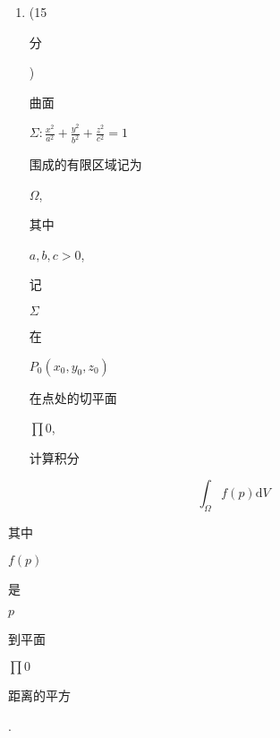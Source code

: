 \documentclass[10pt]{article}
\begin{document}
\begin{enumerate}
  \item (15 \begin{CJK}{UTF8}{mj}分\end{CJK}) \begin{CJK}{UTF8}{mj}曲面\end{CJK} $\Sigma: \frac{x^{2}}{a^{2}}+\frac{y^{2}}{b^{2}}+\frac{z^{2}}{c^{2}}=1$ \begin{CJK}{UTF8}{mj}围成的有限区域记为\end{CJK} $\Omega$, \begin{CJK}{UTF8}{mj}其中\end{CJK} $a, b, c>0$, \begin{CJK}{UTF8}{mj}记\end{CJK} $\Sigma$ \begin{CJK}{UTF8}{mj}在\end{CJK} $P_{0}\left(x_{0}, y_{0}, z_{0}\right)$ \begin{CJK}{UTF8}{mj}在点处的切平面\end{CJK} $\prod 0$, \begin{CJK}{UTF8}{mj}计算积分\end{CJK}

\end{enumerate}
$$
\int_{\Omega} f(p) \mathrm{d} V
$$
\begin{CJK}{UTF8}{mj}其中\end{CJK} $f(p)$ \begin{CJK}{UTF8}{mj}是\end{CJK} $p$ \begin{CJK}{UTF8}{mj}到平面\end{CJK} $\prod 0$ \begin{CJK}{UTF8}{mj}距离的平方\end{CJK}.
\end{document}
